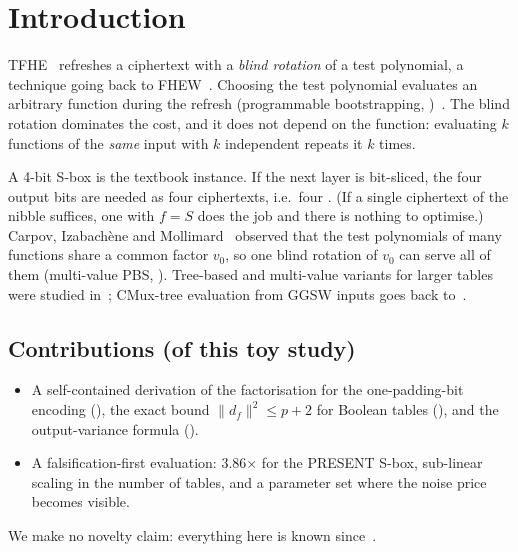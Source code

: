 \section{Introduction}\label{sec:intro}
TFHE~\cite{CGGI16,CGGI20} refreshes a ciphertext with a \emph{blind rotation} of a test
polynomial, a technique going back to FHEW~\cite{DM15}. Choosing the test polynomial evaluates
an arbitrary function during the refresh (programmable bootstrapping, \PBSop)~\cite{CJP21}.
The blind rotation dominates the cost, and it does not depend on the function: evaluating
$k$ functions of the \emph{same} input with $k$ independent \PBSop{} repeats it $k$ times.

A 4-bit S-box is the textbook instance. If the next layer is bit-sliced, the four output bits
are needed as four ciphertexts, i.e.\ four \PBSop{}. (If a single ciphertext of the nibble
suffices, one \PBSop{} with $f=S$ does the job and there is nothing to optimise.)
Carpov, Izabach\`ene and Mollimard~\cite{CIM19} observed that the test polynomials of many
functions share a common factor $v_0$, so one blind rotation of $v_0$ can serve all of them
(multi-value PBS, \MVPBS). Tree-based and multi-value variants for larger tables were studied
in~\cite{GBA21}; CMux-tree evaluation from GGSW inputs goes back to~\cite{CGGI17}.

\subsection{Contributions (of this toy study)}
\begin{itemize}
\item A self-contained derivation of the factorisation for the one-padding-bit encoding
  (), the exact bound $\|d_f\|^2\le p+2$ for Boolean tables
  (), and the output-variance formula ().
\item A falsification-first evaluation: 3.86× for the PRESENT S-box, sub-linear
  scaling in the number of tables, and a parameter set where the noise price becomes visible.
\end{itemize}
We make no novelty claim: everything here is known since~\cite{CIM19}.
